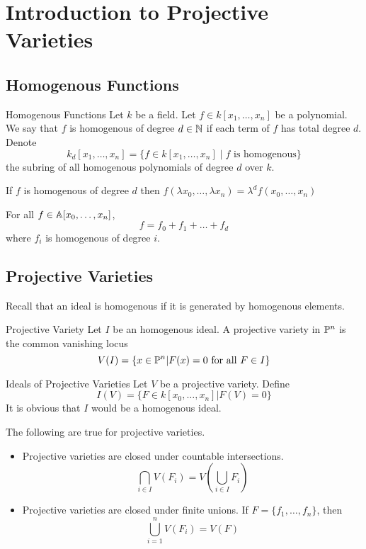 \documentclass[a4paper]{article}
\begin{document}
\pagebreak
\section{Introduction to Projective Varieties}
\subsection{Homogenous Functions}
\begin{defn}{Homogenous Functions}{} Let $k$ be a field. Let $f\in k[x_1,\dots,x_n]$ be a polynomial. We say that $f$ is homogenous of degree $d\in\mathbb{N}$ if each term of $f$ has total degree $d$. Denote $$k_d[x_1,\dots,x_n]=\{f\in k[x_1,\dots,x_n]\;|\;f\text{ is homogenous}\}$$ the subring of all homogenous polynomials of degree $d$ over $k$. 
\end{defn}

\begin{lmm}{}{} If $f$ is homogenous of degree $d$ then $f(\lambda x_0,\dots,\lambda x_n)=\lambda^df(x_0,\dots,x_n)$
\end{lmm}

\begin{lmm}{}{} For all $f\in\mathbb{A}[x_0,\dots,x_n]$, $$f=f_0+f_1+\dots+f_d$$ where $f_i$ is homogenous of degree $i$. 
\end{lmm}

\subsection{Projective Varieties}
Recall that an ideal is homogenous if it is generated by homogenous elements. 

\begin{defn}{Projective Variety}{} Let $I$ be an homogenous ideal. A projective variety in $\mathbb{P}^n$ is the common vanishing locus $$V(I)=\{x\in\mathbb{P}^n|F(x)=0\text{ for all }F\in I\}$$ 
\end{defn}

\begin{defn}{Ideals of Projective Varieties}{} Let $V$ be a projective variety. Define $$I(V)=\{F\in k[x_0,\dots,x_n]|F(V)=0\}$$ It is obvious that $I$ would be a homogenous ideal. 
\end{defn}

\begin{prp}{}{} The following are true for projective varieties. 
\begin{itemize}
\item Projective varieties are closed under countable intersections. $$\bigcap_{i\in I}V(F_i)=V\left(\bigcup_{i\in I}F_i\right)$$
\item Projective varieties are closed under finite unions. If $F=\{f_1,\dots,f_n\}$, then $$\bigcup_{i=1}^nV(F_i)=V(F)$$
\end{itemize}
\end{prp}
\end{document}

